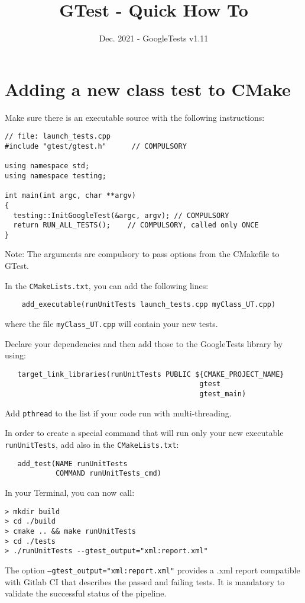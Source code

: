 \documentclass{article}
\title{GTest - Quick How To}
\date{Dec. 2021 - GoogleTests v1.11}
\begin{document}
\maketitle

\section{Adding a new class test to CMake}

Make sure there is an executable source with the following instructions:
\begin{verbatim}
// file: launch_tests.cpp
#include "gtest/gtest.h"      // COMPULSORY

using namespace std;
using namespace testing;

int main(int argc, char **argv)
{
  testing::InitGoogleTest(&argc, argv); // COMPULSORY
  return RUN_ALL_TESTS();    // COMPULSORY, called only ONCE
}
\end{verbatim}

Note: The arguments are compulsory to pass options from the CMakefile to GTest.

\bigskip
In the \texttt{CMakeLists.txt}, you can add the following lines:
\begin{verbatim}
    add_executable(runUnitTests launch_tests.cpp myClass_UT.cpp)
\end{verbatim}
where the file \texttt{myClass\_UT.cpp} will contain your new tests.

\bigskip
Declare your dependencies and then add those to the GoogleTests library by using:
\begin{verbatim}
   target_link_libraries(runUnitTests PUBLIC ${CMAKE_PROJECT_NAME}
                                              gtest
                                              gtest_main)
\end{verbatim}
Add \texttt{pthread} to the list if your code run with multi-threading.

\bigskip
In order to create a special command that will run only your new executable \texttt{runUnitTests}, add also in the \texttt{CMakeLists.txt}:
\begin{verbatim}
   add_test(NAME runUnitTests
            COMMAND runUnitTests_cmd)
\end{verbatim}

\bigskip
In your Terminal, you can now call:
\begin{verbatim}
> mkdir build
> cd ./build
> cmake .. && make runUnitTests
> cd ./tests
> ./runUnitTests --gtest_output="xml:report.xml"
\end{verbatim}
The option \texttt{--gtest\_output="xml:report.xml"} provides a .xml report compatible with Gitlab CI that describes the passed and failing tests. It is mandatory to validate the successful status of the pipeline.
\end{document}
